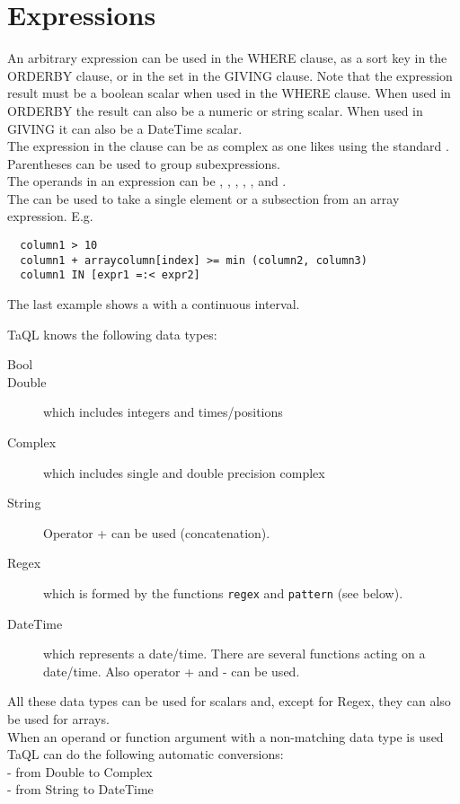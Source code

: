 \section{\label{TAQL:EXPRESSIONS}Expressions}
An arbitrary expression can be used in the WHERE clause, as a sort
key in the ORDERBY clause, or in the set in the GIVING clause.
Note that the expression result must be
a boolean scalar when used in the WHERE clause. When used in ORDERBY
the result can also be a numeric or string scalar. When used in 
GIVING it can also be a DateTime scalar.
\\The expression in the clause can be as complex as one likes
using the standard
.
Parentheses can be used to group subexpressions.
\\The operands in an expression can be
,
,
,
,
, and
.
\\The {} can be used to take a
single element or a subsection from an array expression.
E.g.
\begin{verbatim}
  column1 > 10
  column1 + arraycolumn[index] >= min (column2, column3)
  column1 IN [expr1 =:< expr2]
\end{verbatim}
The last example shows a  with a continuous interval.

\label{TAQL:DATATYPES}
TaQL knows the following data types:
\begin{description}
  \item[ Bool]
  \item[ Double] which includes integers and times/positions
  \item[ Complex ] which includes single and double precision complex
  \item[ String ] Operator + can be used (concatenation).
  \item[ Regex ] which is formed by the functions \texttt{regex}
    and \texttt{pattern} (see below).
  \item[ DateTime ] which represents a date/time. There are several functions
       acting on a date/time. Also operator + and - can be used.
\end{description}
All these data types can be used for scalars and, except for Regex,
they can also be used for arrays.
\\When an operand or function argument with a non-matching data type
is used TaQL can do the following automatic conversions:
\\- from Double to Complex
\\- from String to DateTime



